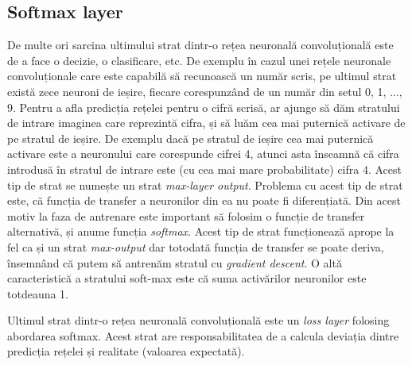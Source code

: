 \subsection{Softmax layer}
De multe ori sarcina ultimului strat dintr-o rețea neuronală convoluțională este de a face o decizie, o clasificare, etc. De exemplu în cazul unei rețele neuronale convoluționale care este capabilă să recunoască un număr scris, pe ultimul strat există zece neuroni de ieșire, fiecare corespunzând de un număr din setul {0, 1, ..., 9}. Pentru a afla predicția rețelei pentru o cifră scrisă, ar ajunge să dăm stratului de intrare imaginea care reprezintă cifra, și să luăm cea mai puternică activare de pe stratul de ieșire. De exemplu dacă pe stratul de ieșire cea mai puternică activare este a neuronului care corespunde cifrei 4, atunci asta înseamnă că cifra introdusă în stratul de intrare este (cu cea mai mare probabilitate) cifra 4.\newline
Acest tip de strat se numește un strat \textit{max-layer output}. Problema cu acest tip de strat este, că funcția de transfer a neuronilor din ea nu poate fi diferențiată. Din acest motiv la faza de antrenare este important să folosim o funcție de transfer alternativă, și anume funcția \textit{softmax}. Acest tip de strat funcționează aprope la fel ca și un strat \textit{max-output} dar totodată funcția de transfer se poate deriva, însemnând că putem să antrenăm stratul cu \textit{gradient descent}. O altă caracteristică a stratului soft-max este că suma activărilor neuronilor este totdeauna 1.



Ultimul strat dintr-o rețea neuronală convoluțională este un \textit{loss layer} folosing abordarea softmax.\newline
Acest strat are responsabilitatea de a calcula deviația dintre predicția rețelei și realitate (valoarea expectată). 


\label{cap:fund-teoretice}